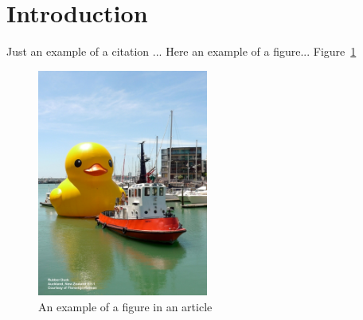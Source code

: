 
\section{Introduction}
\label{sec:introduction}
Just an example of a citation \cite{nobody}...
Here an example of a figure...
Figure~\ref{fig:example}
\begin{figure}[!ht]
  \centering
    \includegraphics[width=0.5\textwidth]{figures/rubberduck}
    \caption{An example of a figure in an article}
    \label{fig:example}
\end{figure}
